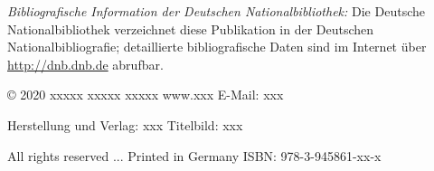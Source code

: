 \normalsize
\textit{Bibliografische Information der Deutschen Nationalbibliothek:}
\newline
Die Deutsche Nationalbibliothek verzeichnet diese Publikation in der Deutschen Nationalbibliografie; detaillierte bibliografische Daten sind im Internet über \url{http://dnb.dnb.de} abrufbar.
\newline
\newline
\newline

© 2020 xxxxx\newline
\tab[1.5cm]xxxxx\newline
\tab[1.5cm]xxxxx\newline
\tab[1.5cm]www.xxx\newline
\tab[1.5cm]E-Mail: xxx\newline
\newline

Herstellung und Verlag: xxx
\newline
\newline
Titelbild: xxx
\newline
\par\vfill
All rights reserved ...
\newline
\newline
Printed in Germany
\newline
\newline
\newline
ISBN: 978-3-945861-xx-x